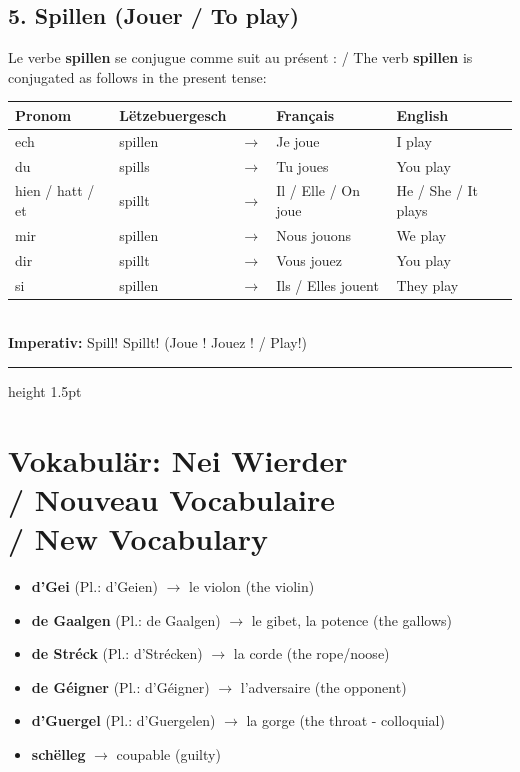 \subsection*{5. Spillen (Jouer / To play)}
Le verbe \textbf{spillen} se conjugue comme suit au présent : / The verb \textbf{spillen} is conjugated as follows in the present tense:

\noindent
\begin{tabular}{ll c l l}
    \toprule
    \textbf{Pronom} & \textbf{Lëtzebuergesch} & \textbf{} & \textbf{Français} & \textbf{English} \\
    \midrule
    ech & spillen & $\rightarrow$ & Je joue & I play \\
    du & spills & $\rightarrow$ & Tu joues & You play \\
    hien / hatt / et & spillt & $\rightarrow$ & Il / Elle / On joue & He / She / It plays \\
    \midrule
    mir & spillen & $\rightarrow$ & Nous jouons & We play \\
    dir & spillt & $\rightarrow$ & Vous jouez & You play \\
    si & spillen & $\rightarrow$ & Ils / Elles jouent & They play \\
    \bottomrule
\end{tabular}
\\[1em]
\textbf{Imperativ:} Spill! Spillt! (Joue ! Jouez ! / Play!)

\vspace{1.5cm}
\color{geminiBlue}\hrule height 1.5pt \vspace{0.5em}\color{black}
\section[Vokabulär: Nei Wierder]{Vokabulär: Nei Wierder \\/ Nouveau Vocabulaire \\/ New Vocabulary}

\begin{itemize}
    \item \textbf{d'Gei} (Pl.: d'Geien) $\rightarrow$ le violon (the violin)
    \item \textbf{de Gaalgen} (Pl.: de Gaalgen) $\rightarrow$ le gibet, la potence (the gallows)
    \item \textbf{de Stréck} (Pl.: d'Strécken) $\rightarrow$ la corde (the rope/noose)
    \item \textbf{de Géigner} (Pl.: d'Géigner) $\rightarrow$ l'adversaire (the opponent)
    \item \textbf{d'Guergel} (Pl.: d'Guergelen) $\rightarrow$ la gorge (the throat - colloquial)
    \item \textbf{schëlleg} $\rightarrow$ coupable (guilty)
\end{itemize}

